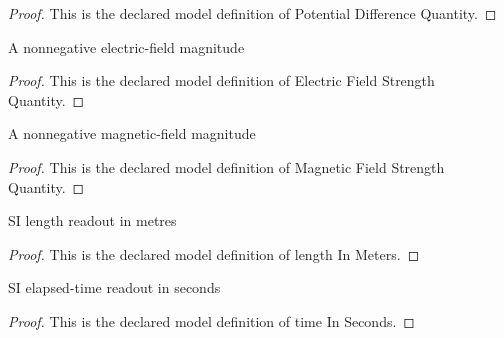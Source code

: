 \begin{proof}
  This is the declared model definition of Potential Difference Quantity.
\end{proof}
\begin{definition}
  \label{def:physics:phyx-mini-0496:phyxminiproblems-problemphyxmini0496-electricfieldstrengthquantity}
  A nonnegative electric-field magnitude
\end{definition}
\begin{proof}
  This is the declared model definition of Electric Field Strength Quantity.
\end{proof}
\begin{definition}
  \label{def:physics:phyx-mini-0496:phyxminiproblems-problemphyxmini0496-magneticfieldstrengthquantity}
  A nonnegative magnetic-field magnitude
\end{definition}
\begin{proof}
  This is the declared model definition of Magnetic Field Strength Quantity.
\end{proof}
\begin{definition}
  \label{def:physics:phyx-mini-0496:phyxminiproblems-problemphyxmini0496-lengthinmeters}
  SI length readout in metres
\end{definition}
\begin{proof}
  This is the declared model definition of length In Meters.
\end{proof}
\begin{definition}
  \label{def:physics:phyx-mini-0496:phyxminiproblems-problemphyxmini0496-timeinseconds}
  SI elapsed-time readout in seconds
\end{definition}
\begin{proof}
  This is the declared model definition of time In Seconds.
\end{proof}
